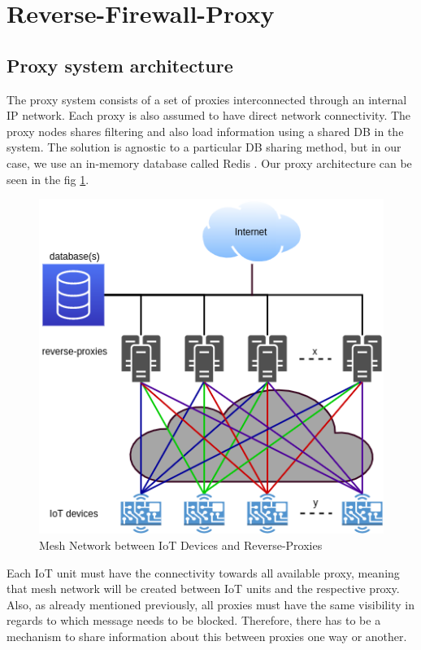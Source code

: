 \documentclass[sigplan,screen]{acmart}
\begin{document}
\section{Reverse-Firewall-Proxy}
\subsection{Proxy system architecture}
The proxy system consists of a set of proxies interconnected through an internal IP network. Each proxy is also assumed to have direct network connectivity. The proxy nodes shares filtering and also load information using a shared DB in the system. The solution is agnostic to a particular DB sharing method, but in our case, we use an in-memory database called Redis \cite{redis}. Our proxy architecture can be seen in the fig \ref{proxies}.

\begin{figure}[htbp]
\centerline{\includegraphics[scale=0.35]{pic/proxies.png}}
\caption{Mesh Network between IoT Devices and Reverse-Proxies}
\label{proxies}
\end{figure}

Each IoT unit must have the connectivity towards all available proxy, meaning that mesh network will be created between IoT units and the respective proxy. Also, as already mentioned previously, all proxies must have the same visibility in regards to which message needs to be blocked. Therefore, there has to be a mechanism to share information about this between proxies one way or another. 
\end{document}
